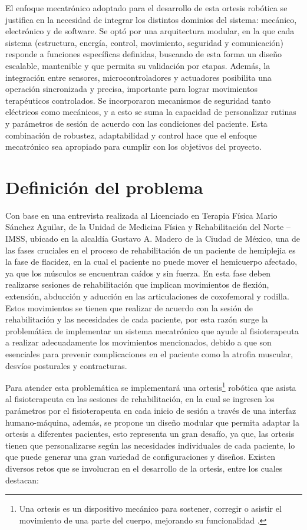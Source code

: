 El enfoque mecatrónico adoptado para el desarrollo de esta ortesis robótica se justifica en la necesidad de integrar los distintos dominios del sistema: mecánico, electrónico y de software. Se optó por una arquitectura modular, en la que cada sistema (estructura, energía, control, movimiento, seguridad y comunicación) responde a funciones específicas definidas, buscando de esta forma un diseño escalable, mantenible y que permita su validación por etapas. Además, la integración entre sensores, microcontroladores y actuadores posibilita una operación sincronizada y precisa, importante para lograr movimientos terapéuticos controlados. Se incorporaron mecanismos de seguridad tanto eléctricos como mecánicos, y a esto se suma la capacidad de personalizar rutinas y parámetros de sesión de acuerdo con las condiciones del paciente. Esta combinación de robustez, adaptabilidad y control hace que el enfoque mecatrónico sea apropiado para cumplir con los objetivos del proyecto.



\section{Definición del problema}
Con base en una entrevista realizada al Licenciado en Terapia Física Mario Sánchez Aguilar, de la Unidad de Medicina Física y Rehabilitación del Norte – IMSS, ubicado en la alcaldía Gustavo A. Madero de la Ciudad de México, una de las fases cruciales en el proceso de rehabilitación de un paciente de hemiplejia es la fase de flacidez, en la cual el paciente no puede mover el hemicuerpo afectado, ya que los músculos se encuentran caídos y sin fuerza. En esta fase deben realizarse sesiones de rehabilitación que implican movimientos de flexión, extensión, abducción y aducción en las articulaciones de coxofemoral y rodilla. Estos movimientos se tienen que realizar de acuerdo con la sesión de rehabilitación y las necesidades de cada paciente, por esta razón surge la problemática de implementar un sistema mecatrónico que ayude al fisioterapeuta a realizar adecuadamente los movimientos mencionados, debido a que son esenciales para prevenir complicaciones en el paciente como la atrofia muscular, desvíos posturales y contracturas.

Para atender esta problemática se implementará una ortesis\footnote{Una ortesis es un dispositivo mecánico para sostener, corregir o asistir el movimiento de una parte del cuerpo, mejorando su funcionalidad \cite{20}.} robótica que asista al fisioterapeuta en las sesiones de rehabilitación, en la cual se ingresen los parámetros por el fisioterapeuta en cada inicio de sesión a través de una interfaz humano-máquina, además, se propone un diseño modular que permita adaptar la ortesis a diferentes pacientes, esto representa un gran desafío, ya que, las ortesis tienen que personalizarse según las necesidades individuales de cada paciente, lo que puede generar una gran variedad de configuraciones y diseños. Existen diversos retos que se involucran en el desarrollo de la ortesis, entre los cuales destacan:

